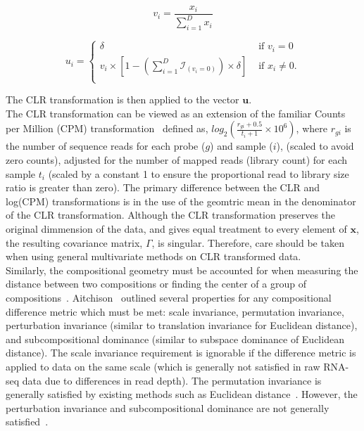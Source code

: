 \documentclass{article}\usepackage[]{graphicx}\usepackage[]{color}
\theoremstyle{definition}
\begin{document}
\begin{equation}
v_i = \frac{x_i}{\sum_{i = 1}^{D} x_i}
\end{equation}

\begin{equation}
u_i  = 
  \begin{cases} 
    \delta  & \text{ if }v_i = 0\\
    v_i \times \left[1 - \left( \sum_{i = 1}^{D} \mathcal{I}_{\left(v_i = 0\right)}\right) \times \delta  \right] & \text{ if }x_i \ne 0.\\
  \end{cases}
\label{MFclr}
\end{equation}

The CLR transformation is then applied to the vector $\mathbf{u}$.\\

The CLR transformation can be viewed as an extension of the familiar Counts per Million (CPM) transformation~\cite{Law2014} defined as, $log_2 \left(\frac{r_{gi}+0.5}{t_i+1} \times 10^6 \right)$, where $r_{gi}$ is the number of sequence reads for each probe ($g$) and sample ($i$), (scaled to avoid zero counts), adjusted for the number of mapped reads (library count) for each sample $t_i$ (scaled by a constant 1 to ensure the proportional read to library size ratio is greater than zero). The primary difference between the CLR and log(CPM) transformations is in the use of the geomtric mean in the denominator of the CLR transformation. Although the CLR transformation preserves the original dimmension of the data, and gives equal treatment to every element of $\mathbf{x}$, the resulting covariance matrix, $\Gamma$, is singular.  Therefore, care should be taken when using general multivariate methods on CLR transformed data.\\

Similarly, the compositional geometry must be accounted for when measuring the distance between two compositions or finding the center of a group of compositions~\cite{Aitchison2000}.  Aitchison~\cite{Aitchison1992} outlined several properties for any compositional difference metric which must be met: scale invariance, permutation invariance, perturbation invariance (similar to translation invariance for Euclidean distance), and subcompositional dominance (similar to subspace dominance of Euclidean distance).  The scale invariance requirement is ignorable if the difference metric is applied to data on the same scale (which is generally not satisfied in raw RNA-seq data due to differences in read depth). The permutation invariance is generally satisfied by existing methods such as Euclidean distance~\cite{Martin-Fernandez1998}. However, the perturbation invariance and subcompositional dominance are not generally satisfied~\cite{Martin-Fernandez1998}. \\
\end{document}
